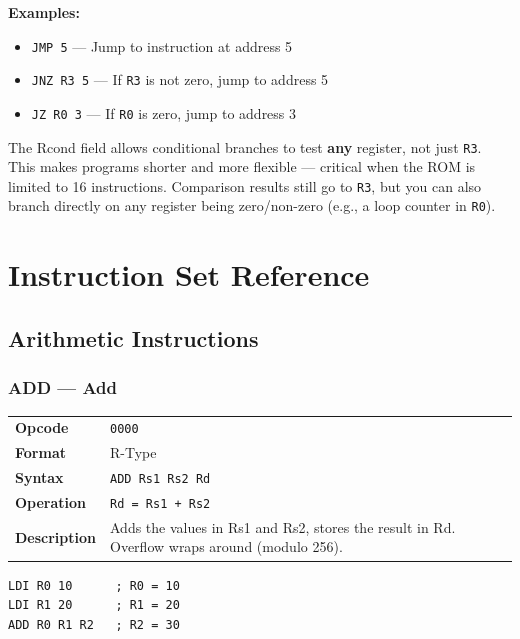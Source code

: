 \documentclass[11pt,a4paper]{article}
\newcommand{\reg}[1]{\texttt{R#1}}
\newcommand{\opcode}[1]{\texttt{#1}}
\begin{document}
\textbf{Examples:}
\begin{itemize}[nosep]
  \item \lstinline|JMP 5| --- Jump to instruction at address 5
  \item \lstinline|JNZ R3 5| --- If \reg{3} is not zero, jump to address 5
  \item \lstinline|JZ R0 3| --- If \reg{0} is zero, jump to address 3
\end{itemize}

\begin{designnote}
The Rcond field allows conditional branches to test \textbf{any} register, not just \reg{3}. This makes programs shorter and more flexible --- critical when the ROM is limited to 16 instructions. Comparison results still go to \reg{3}, but you can also branch directly on any register being zero/non-zero (e.g., a loop counter in \reg{0}).
\end{designnote}

\section{Instruction Set Reference}

\subsection{Arithmetic Instructions}

\subsubsection{ADD --- Add}

\begin{table}[H]
\begin{tabularx}{\textwidth}{@{}lX@{}}
\toprule
\textbf{Opcode}      & \opcode{0000} \\
\textbf{Format}      & R-Type \\
\textbf{Syntax}      & \lstinline|ADD Rs1 Rs2 Rd| \\
\textbf{Operation}   & \texttt{Rd = Rs1 + Rs2} \\
\textbf{Description} & Adds the values in Rs1 and Rs2, stores the result in Rd. Overflow wraps around (modulo 256). \\
\bottomrule
\end{tabularx}
\end{table}

\begin{lstlisting}
LDI R0 10      ; R0 = 10
LDI R1 20      ; R1 = 20
ADD R0 R1 R2   ; R2 = 30
\end{lstlisting}
\end{document}
